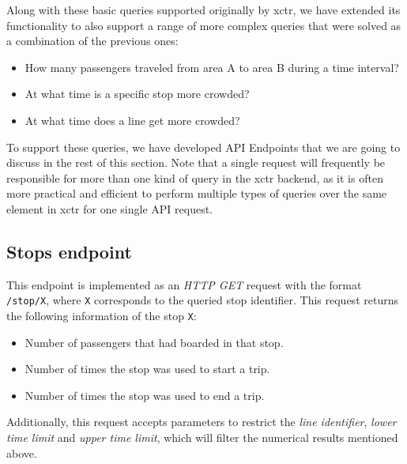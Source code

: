     Along with these basic queries supported originally by \gls{xctr},\cite{brisaboa2018new} we have extended its functionality to also support a range of more complex queries that were  solved as a combination of the previous ones:
    
    \begin{itemize}
        \item How many passengers traveled from area A to area B during a time interval? 
        \item At what time is a specific stop more crowded?
        \item At what time does a line get more crowded?
    \end{itemize}
    
    To support these queries, we have developed API Endpoints that we are going to discuss in the rest of this section. Note that a single request will frequently be responsible for more than one kind of query in the \gls{xctr} backend, as it is often more practical and efficient to perform multiple types of queries over the same element in \gls{xctr} for one single API request.
    
    \subsection{Stops endpoint}
    This endpoint is implemented as an {\em HTTP GET} request with the format \texttt{/stop/X}, where \texttt{X} corresponds to the queried stop identifier. This request returns the following information of the stop \texttt{X}:
    
    \begin{itemize}
        \item Number of passengers that had boarded in that stop.
        \item Number of times the stop was used to start a trip.
        \item Number of times the stop was used to end a trip.
    \end{itemize}
    
    Additionally, this request accepts parameters to restrict the \textit{line identifier}, \textit{lower time limit} and \textit{upper time limit}, which will filter the numerical results mentioned above.
    
